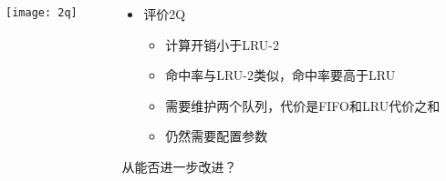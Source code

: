 \begin{frame}[plain]
	\frametitle{ }
	\begin{columns}
		\begin{column}{.4\textwidth}
			\centering
			\texttt{[image: 2q]}
		\end{column}
		
		\begin{column}{.6\textwidth}
			
			\begin{itemize}
				\item 评价2Q
				\begin{itemize}
					\item 计算开销小于LRU-2
					\item 命中率与LRU-2类似，命中率要高于LRU
					\item 需要维护两个队列，代价是FIFO和LRU代价之和
					\item 仍然需要配置参数

				\end{itemize}
			\end{itemize}
						\centering
						\large 从能否进一步改进？
												
		\end{column}
		
		
	\end{columns}
\end{frame}




